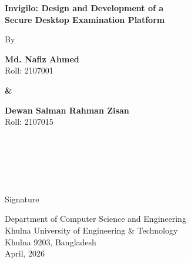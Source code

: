 \documentclass[12pt, a4paper]{report}
\newcommand{\blanklines}[1]{\vspace{#1\dimexpr 18pt\relax}}
\begin{document}
\begin{center}

  {\fontsize{18}{27}\bfseries
     Invigilo: Design and Development of a \\
    Secure Desktop Examination Platform  \\
  }

  \blanklines{3}

  {\fontsize{12}{18}\selectfont By}

  \blanklines{2}

  {\fontsize{12}{18}\bfseries Md. Nafiz Ahmed}\\[0pt]
  {\fontsize{12}{18}\selectfont Roll: 2107001}

  {\fontsize{12}{18}\bfseries \&}

  {\fontsize{12}{18}\bfseries Dewan Salman Rahman Zisan}\\[0pt]
  {\fontsize{12}{18}\selectfont Roll: 2107015}

\end{center}

\blanklines{4}

\\[0pt]
\\[0pt]
\\[0pt]
\\[0pt]
\hfill \underline{\hspace{1.5in}}\\
\hspace*{0.8in}
\hfill {\fontsize{12}{18}\selectfont Signature}

\vfill

\begin{center}
  {\fontsize{12}{18}\selectfont
    Department of Computer Science and Engineering\\
    Khulna University of Engineering \& Technology\\
    Khulna 9203, Bangladesh\\
    April, 2026
  }
\end{center}
\end{document}
